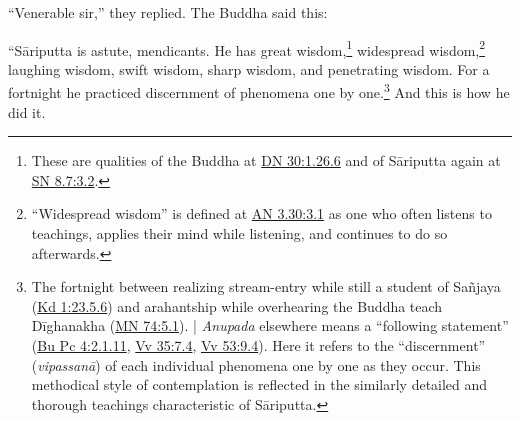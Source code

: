 \documentclass[12pt,openany]{book}%
\begin{document}
“Venerable sir,” they replied. The Buddha said this: 

“\textsanskrit{Sāriputta} is astute, mendicants. He has great wisdom,\footnote{These are qualities of the Buddha at \href{https://suttacentral.net/dn30/en/sujato\#1.26.6}{DN 30:1.26.6} and of \textsanskrit{Sāriputta} again at \href{https://suttacentral.net/sn8.7/en/sujato\#3.2}{SN 8.7:3.2}. } widespread wisdom,\footnote{“Widespread wisdom” is defined at \href{https://suttacentral.net/an3.30/en/sujato\#3.1}{AN 3.30:3.1} as one who often listens to teachings, applies their mind while listening, and continues to do so afterwards. } laughing wisdom, swift wisdom, sharp wisdom, and penetrating wisdom. For a fortnight he practiced discernment of phenomena one by one.\footnote{The fortnight between realizing stream-entry while still a student of \textsanskrit{Sañjaya} (\href{https://suttacentral.net/pli-tv-kd1/en/sujato\#23.5.6}{Kd 1:23.5.6}) and arahantship while overhearing the Buddha teach \textsanskrit{Dīghanakha} (\href{https://suttacentral.net/mn74/en/sujato\#5.1}{MN 74:5.1}). | \textit{Anupada} elsewhere means a “following statement” (\href{https://suttacentral.net/pli-tv-bu-vb-pc4/en/sujato\#2.1.11}{Bu Pc 4:2.1.11}, \href{https://suttacentral.net/vv35/en/sujato\#7.4}{Vv 35:7.4}, \href{https://suttacentral.net/vv53/en/sujato\#9.4}{Vv 53:9.4}). Here it refers to the “discernment” (\textit{\textsanskrit{vipassanā}}) of each individual phenomena one by one as they occur. This methodical style of contemplation is reflected in the similarly detailed and thorough teachings characteristic of \textsanskrit{Sāriputta}. } And this is how he did it. 
\end{document}

